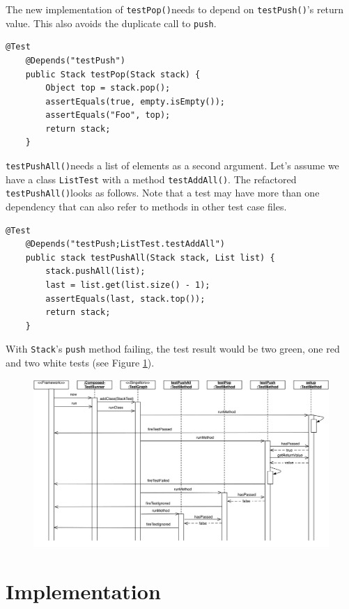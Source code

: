 \documentclass[11pt]{article}
\newcommand{\ttt}[1]{\texttt{#1}}
\newcommand{\testPush}{\ttt{testPush()}}
\newcommand{\testPushAll}{\ttt{testPushAll()}}
\newcommand{\testPop}{\ttt{testPop()}}
\begin{document}
The new implementation of \testPop needs to depend on \testPush's return value. This also avoids the duplicate call to \ttt{push}.

\begin{lstlisting}[label=lst:testpop,caption=Avoid code duplication using dependencies.]
    @Test
    @Depends("testPush")
    public Stack testPop(Stack stack) {
        Object top = stack.pop();
        assertEquals(true, empty.isEmpty());
        assertEquals("Foo", top);
        return stack;
    }
\end{lstlisting}

\testPushAll needs a list of elements as a second argument. Let's assume we have a class \ttt{ListTest} with a method \ttt{testAddAll()}. The refactored \testPushAll looks as follows. Note that a test may have more than one dependency that can also refer to methods in other test case files.

\begin{lstlisting}[label=lst:testpushall,caption=A test may have multiple dependencies.]
    @Test
    @Depends("testPush;ListTest.testAddAll")
    public stack testPushAll(Stack stack, List list) {
        stack.pushAll(list);
        last = list.get(list.size() - 1);
        assertEquals(last, stack.top());
        return stack;
    }
\end{lstlisting}

With \ttt{Stack}'s \ttt{push} method failing, the test result would be two green, one red and two white tests (see Figure \ref{fig:testPush}).

\begin{figure}[htbp]
 \includegraphics[width=15.0cm]{testPush.pdf}
 \caption{}
 \label{fig:testPush}
\end{figure}

\section{Implementation}
\end{document}
